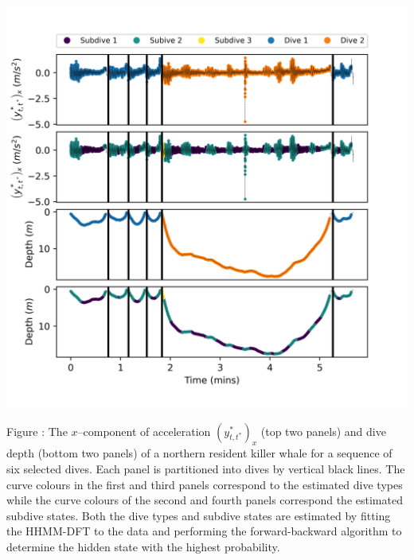 \documentclass{article}
\begin{document}
        \begin{center}
        \includegraphics[width=6in]{../Plots/2019/20190902-182840-CATs_OB_1_0_267_HHMM_decoded_dives.png}
        \end{center}
        
        \noindent Figure : The $x$--component of acceleration $(y^*_{t,t^*})_x$ (top two panels) and dive depth (bottom two panels) of a northern resident killer whale for a sequence of six selected dives. Each panel is partitioned into dives by vertical black lines. The curve colours in the first and third panels correspond to the estimated dive types while the curve colours of the second and fourth panels correspond the estimated subdive states. Both the dive types and subdive states are estimated by fitting the HHMM-DFT to the data and performing the forward-backward algorithm to determine the hidden state with the highest probability.
        \addtocounter{fignum}{1}
        
\end{document}
